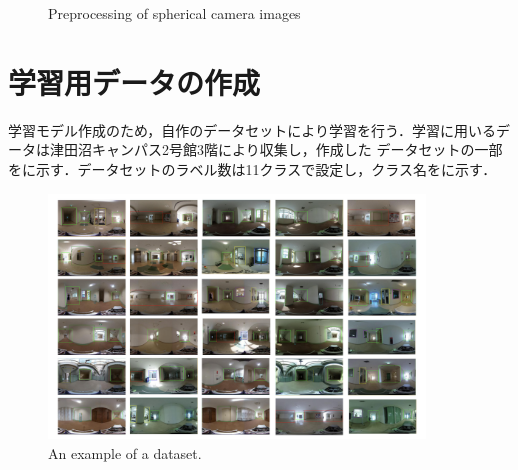 \documentclass[../main]{subfiles}
\begin{document}
        \begin{figure}[htbp]
          \centering
           \caption{Preprocessing of spherical camera images}
           \label{figure::proc_exp}
        \end{figure}
        
        \newpage

        \section{学習用データの作成}
        学習モデル作成のため，自作のデータセットにより学習を行う．学習に用いるデータは津田沼キャンパス2号館3階により収集し，作成した
        データセットの一部をに示す．データセットのラベル数は11クラスで設定し，クラス名をに示す．    

        \begin{figure}[H]
         \centering
         \includegraphics[width=10cm]{../images/dataset_exp.png}
         \caption{An example of a dataset.}
         \label{figure::dataset_fig}
        \end{figure}
\end{document}
